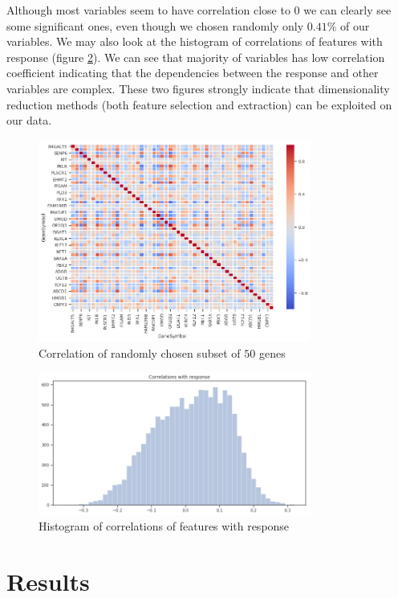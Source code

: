 \documentclass[12pt, wide]{mwart}
\begin{document}
Although most variables seem to have correlation close to $0$ we can clearly see some significant ones, even though we chosen randomly only $0.41$\% of our variables. We may also look at the histogram of correlations of features with response (figure \ref{fig:corrHist}). We can see that majority of variables has low correlation coefficient indicating that the dependencies between the response and other variables are complex. These two figures strongly indicate that dimensionality reduction methods (both feature selection and extraction) can be exploited on our data.

\begin{figure}
\centering
\includegraphics[width=0.8\textwidth]{images/heatmap.png}
\caption{Correlation of randomly chosen subset of $50$ genes}
\label{fig:heatmap}
\end{figure}

\begin{figure}
\centering
\includegraphics[width=0.8\textwidth]{images/corrHist.png}
\caption{Histogram of correlations of features with response}
\label{fig:corrHist}
\end{figure}

\section{Results}
\end{document}
